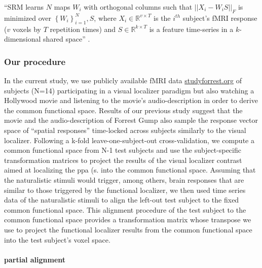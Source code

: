 %
``SRM learns $N$ maps $W_{i}$ with orthogonal columns such that
$||X_{i}-W_{i}S||_{F}$ is minimized over $\left\{ W_{i}\right\} _{i=1}^{N},S$,
where $X_{i}\in\mathbb{R}^{v\times{T}}$ is the $i^{th}$ subject's fMRI response
($v$ voxels by $T$ repetition times) and $S\in\mathbb{R}^{k\times{T}}$ is a
feature time-series in a $k$-dimensional shared space''
\citep{vodrahalli2018mapping}.


\subsubsection{Our procedure}



In the current study, we use publicly available fMRI data
\href{www.studyforrest.org}{studyforrest.org} of subjects (N=14) participating
in a visual localizer paradigm \citep{sengupta2016extension} but also watching a
Hollywood \citep{hanke2016simultaneous} movie and listening to the movie's
audio-description \citep{hanke2014audiomovie} in order to derive the common
functional space.
%
Results of our previous study suggest \citep{haeusler2022processing} that the
movie and the audio-description of Forrest Gump also sample the response vector
space of ``spatial responses'' time-locked across subjects similarly to the
visual localizer.
%
Following a k-fold leave-one-subject-out cross-validation, we compute a common
functional space from N-1 test subjects and use the subject-specific
transformation matrices to project the results of the visual localizer contrast
aimed at localizing the \ac{ppa} (s. \citet{sengupta2016extension} into the
common functional space.
Assuming that the naturalistic stimuli would trigger, among others, brain
responses that are similar to those triggered by the functional localizer, we
then used time series data of the naturalistic stimuli to align the left-out
test subject to the fixed common functional space.
This alignment procedure of the test subject to the common functional space
provides a transformation matrix whose transpose we use to project
the functional localizer results from the common functional space into the test
subject's voxel space.


\paragraph{partial alignment}

